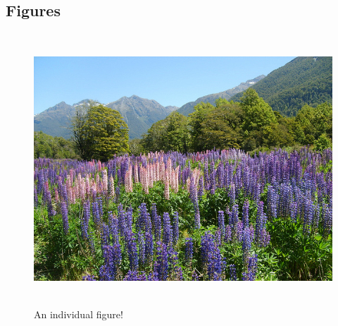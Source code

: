 \documentclass[../../main.tex]{subfiles}  %
\begin{document}
	\subsection{Figures}

	\begin{figure}[hb] %
		\centering
		\includegraphics[height =4in]{./Plots/nature.jpg} 
		\caption{An individual figure!}
	\end{figure}
			
\end{document}
